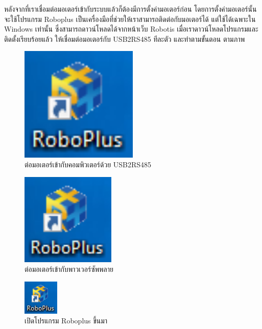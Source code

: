 {หลังจากที่เราเชื่อมต่อมอเตอร์เข้ากับระบบแล้วก็ต้องมีการตั้งค่ามอเตอร์ก่อน โดยการตั้งค่ามอเตอร์นั้นจะใช้โปรแกรม
Roboplus เป็นเครื่องมือที่ช่วยให้เราสามารถติดต่อกับมอเตอร์ได้ แต่ใช้ได้เฉพาะใน Windows เท่านั้น ซึ่งสามารถดาวน์โหลดได้จากหน้าเว็บ Robotis
เมื่อเราดาวน์โหลดโปรแกรมและติดตั้งเรียบร้อยแล้ว ให้เชื่อมต่อมอเตอร์กับ USB2RS485 ทีละตัว และทำตามขั้นตอน ตามภาพ
\begin{figure}[!ht]
    \centering
    \includegraphics[width=0.5\textwidth]{chapter3/images/roboplus/roboplus1.PNG}
    \caption*{ต่อมอเตอร์เข้ากับคอมพิวเตอร์ด้วย USB2RS485}
\end{figure}
\begin{figure}[!ht]
    \centering
    \includegraphics[width=0.4\textwidth]{chapter3/images/roboplus/roboplus1.PNG}
    \caption*{ต่อมอเตอร์เข้ากับพาวเวอร์ซัพพลาย}
\end{figure}
\begin{figure}[!ht]
    \centering
    \includegraphics[width=0.15\textwidth]{chapter3/images/roboplus/roboplus1.PNG}
    \caption*{เปิดโปรแกรม Roboplus ขึ้นมา}
\end{figure}
\begin{figure}[!ht]

\end{figure}}
